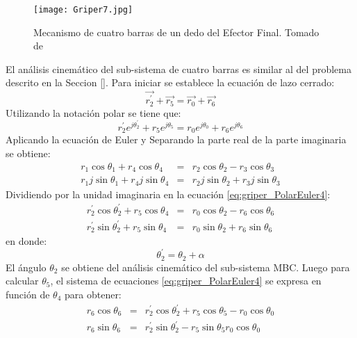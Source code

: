 \begin{figure}[htb]
    \centering
     \texttt{[image: Griper7.jpg]}
    \caption [Mecanismo de cuatro barras de un dedo del Efector Final.]{Mecanismo de cuatro barras de un dedo del Efector Final. Tomado de \cite{zapata_zapata_control_2017} }
    \label{fig:Griper_MEC1}
\end{figure}
El análisis cinemático del sub-sistema de cuatro barras es similar al del problema descrito en la Seccion \ref{}. Para iniciar se establece la ecuación de lazo cerrado:
\begin{equation}\label{eq:griper_lazo}
\vec{r^{\prime}_2}+\vec{r_5}=\vec{r_0}+\vec{r_6}
\end{equation}
Utilizando la notación polar se tiene que:
\begin{equation}\label{eq:griper_lazoPolar}
r^{\prime}_2e^{j\theta^{\prime}_2}+r_5e^{j\theta_5}=r_0e^{j\theta_0}+r_6e^{j\theta_6}
\end{equation}
Aplicando la ecuación de Euler y Separando la parte real de la parte imaginaria se obtiene:
\begin{eqnarray}
r_1 \cos{\theta_1}+r_4\cos{\theta_4}&=&r_2\cos{\theta_2} -r_3\cos{\theta_3} \label{eq:griper_PolarEuler4} \\
r_1j\sin{\theta_1}+r_4j\sin{\theta_4} &=&r_2j\sin{\theta_2}+r_3j\sin{\theta_3}\label{eq:griper_PolarEuler3}
\end{eqnarray}
Dividiendo por la unidad imaginaria en la ecuación \ref{eq:griper_PolarEuler4}: 
\begin{eqnarray}
r^{\prime}_2 \cos{\theta^{\prime}_2}+r_5\cos{\theta_4}&=&r_0\cos{\theta_2} -r_6\cos{\theta_6} \label{eq:griper_PolarEuler4} \\
r^{\prime}_2 \sin{\theta^{\prime}_2}+r_5\sin{\theta_4} &=&r_0\sin{\theta_2}+r_6\sin{\theta_6}\label{eq:griper_PolarEuler3}
\end{eqnarray}
en donde:
\begin{equation}
\theta^{\prime}_2=\theta_2+\alpha
\end{equation}
El ángulo $\theta_2$ se obtiene del análisis cinemático del sub-sistema MBC. Luego para calcular $\theta_5$, el sistema de ecuaciones \ref{eq:griper_PolarEuler4} se expresa en función de $\theta_4$ para obtener:
\begin{eqnarray}
r_6\cos{\theta_6}&=& r^{\prime}_2\cos{\theta^{\prime}_2}+r_5\cos{\theta_5}-r_0\cos{\theta_0}\label{eq:griper_PolarEuler5} \\
r_6\sin{\theta_6} &=&r^{\prime}_2\sin{\theta^{\prime}_2}-r_5\sin{\theta_5}r_0\cos{\theta_0}\label{eq:griper_PolarEuler6}
\end{eqnarray}
